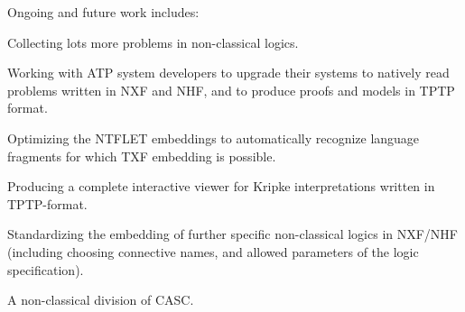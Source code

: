 \documentclass{ceurart}
\newenvironment{packed_itemize}{
\vspace*{-0.3em}
\begin{itemize}
\setlength{\partopsep}{0pt}
\setlength{\itemsep}{1pt}
\setlength{\parskip}{0pt}
\setlength{\parsep}{0pt}
}{\end{itemize}}
\begin{document}
Ongoing and future work includes:
\begin{packed_itemize}
\item Collecting lots more problems in non-classical logics.
\item Working with ATP system developers to upgrade their systems to natively read problems 
      written in NXF and NHF, and to produce proofs and models in TPTP format.
\item Optimizing the NTFLET embeddings to automatically recognize language fragments for which
      TXF embedding is possible.
\item Producing a complete interactive viewer for Kripke interpretations written in TPTP-format.
\item Standardizing the embedding of further specific non-classical logics in NXF/NHF (including
      choosing connective names, and allowed parameters of the logic specification).
\item A non-classical division of CASC.
\end{packed_itemize}


\end{document}
